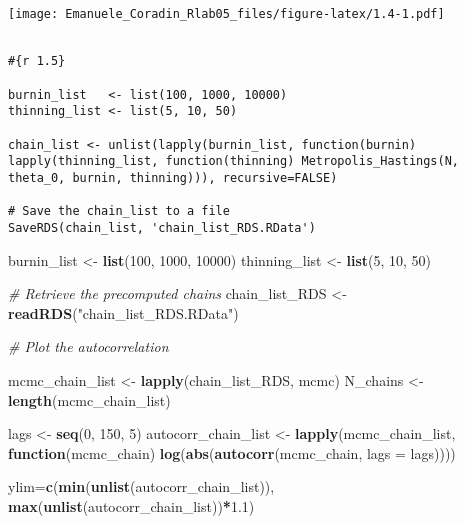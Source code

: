 \documentclass[
]{article}
\newenvironment{Shaded}{\begin{snugshade}}{\end{snugshade}}
\newcommand{\AttributeTok}[1]{\textcolor[rgb]{0.13,0.29,0.53}{#1}}
\newcommand{\CommentTok}[1]{\textcolor[rgb]{0.56,0.35,0.01}{\textit{#1}}}
\newcommand{\ControlFlowTok}[1]{\textcolor[rgb]{0.13,0.29,0.53}{\textbf{#1}}}
\newcommand{\DecValTok}[1]{\textcolor[rgb]{0.00,0.00,0.81}{#1}}
\newcommand{\FloatTok}[1]{\textcolor[rgb]{0.00,0.00,0.81}{#1}}
\newcommand{\FunctionTok}[1]{\textcolor[rgb]{0.13,0.29,0.53}{\textbf{#1}}}
\newcommand{\NormalTok}[1]{#1}
\newcommand{\OtherTok}[1]{\textcolor[rgb]{0.56,0.35,0.01}{#1}}
\newcommand{\SpecialCharTok}[1]{\textcolor[rgb]{0.81,0.36,0.00}{\textbf{#1}}}
\newcommand{\StringTok}[1]{\textcolor[rgb]{0.31,0.60,0.02}{#1}}
\begin{document}
\texttt{[image: Emanuele\_Coradin\_Rlab05\_files/figure-latex/1.4-1.pdf]}

\begin{verbatim}

#{r 1.5}

burnin_list   <- list(100, 1000, 10000)
thinning_list <- list(5, 10, 50)

chain_list <- unlist(lapply(burnin_list, function(burnin) lapply(thinning_list, function(thinning) Metropolis_Hastings(N, theta_0, burnin, thinning))), recursive=FALSE)

# Save the chain_list to a file
SaveRDS(chain_list, 'chain_list_RDS.RData')
\end{verbatim}

\begin{Shaded}
\begin{Highlighting}[]
\NormalTok{burnin\_list   }\OtherTok{\textless{}{-}} \FunctionTok{list}\NormalTok{(}\DecValTok{100}\NormalTok{, }\DecValTok{1000}\NormalTok{, }\DecValTok{10000}\NormalTok{)}
\NormalTok{thinning\_list }\OtherTok{\textless{}{-}} \FunctionTok{list}\NormalTok{(}\DecValTok{5}\NormalTok{, }\DecValTok{10}\NormalTok{, }\DecValTok{50}\NormalTok{)}

\CommentTok{\# Retrieve the precomputed chains}
\NormalTok{chain\_list\_RDS }\OtherTok{\textless{}{-}} \FunctionTok{readRDS}\NormalTok{(}\StringTok{"chain\_list\_RDS.RData"}\NormalTok{)}

\CommentTok{\# Plot the autocorrelation}

\NormalTok{mcmc\_chain\_list }\OtherTok{\textless{}{-}} \FunctionTok{lapply}\NormalTok{(chain\_list\_RDS,  mcmc)}
\NormalTok{N\_chains }\OtherTok{\textless{}{-}} \FunctionTok{length}\NormalTok{(mcmc\_chain\_list)}
  
\NormalTok{lags }\OtherTok{\textless{}{-}} \FunctionTok{seq}\NormalTok{(}\DecValTok{0}\NormalTok{, }\DecValTok{150}\NormalTok{, }\DecValTok{5}\NormalTok{)}
\NormalTok{autocorr\_chain\_list }\OtherTok{\textless{}{-}} \FunctionTok{lapply}\NormalTok{(mcmc\_chain\_list, }\ControlFlowTok{function}\NormalTok{(mcmc\_chain) }\FunctionTok{log}\NormalTok{(}\FunctionTok{abs}\NormalTok{(}\FunctionTok{autocorr}\NormalTok{(mcmc\_chain, }\AttributeTok{lags =}\NormalTok{ lags))))}

\NormalTok{ylim}\OtherTok{=}\FunctionTok{c}\NormalTok{(}\FunctionTok{min}\NormalTok{(}\FunctionTok{unlist}\NormalTok{(autocorr\_chain\_list)), }\FunctionTok{max}\NormalTok{(}\FunctionTok{unlist}\NormalTok{(autocorr\_chain\_list))}\SpecialCharTok{*}\FloatTok{1.1}\NormalTok{)}


\end{Highlighting}
\end{Shaded}
\end{document}
